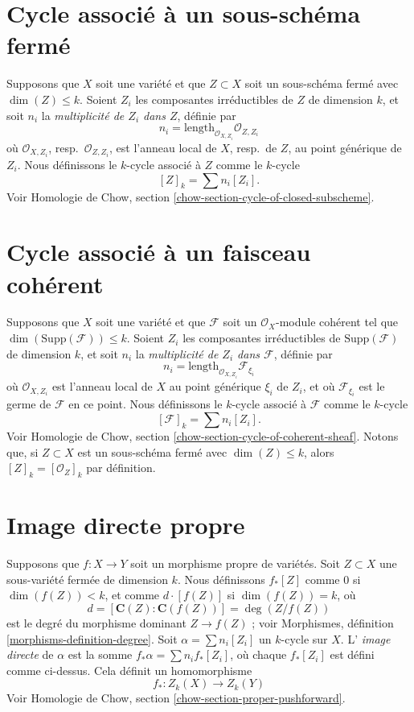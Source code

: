 \section{Cycle associé à un sous-schéma fermé}
\label{section-cycle-of-closed}

\noindent
Supposons que $X$ soit une variété et que $Z \subset X$ soit un sous-schéma fermé
avec $\dim(Z) \leq k$. Soient $Z_i$ les composantes irréductibles de $Z$ de
dimension $k$, et soit $n_i$ la {\it multiplicité de $Z_i$ dans $Z$},
définie par
$$
n_i = \text{length}_{\mathcal{O}_{X, Z_i}} \mathcal{O}_{Z, Z_i}
$$
où $\mathcal{O}_{X, Z_i}$, resp.\ $\mathcal{O}_{Z, Z_i}$, est l'anneau
local de $X$, resp.\ de $Z$, au point générique de $Z_i$.
Nous définissons le $k$-cycle associé à $Z$ comme le $k$-cycle
$$
[Z]_k = \sum n_i [Z_i].
$$
Voir Homologie de Chow, section \ref{chow-section-cycle-of-closed-subscheme}.


\section{Cycle associé à un faisceau cohérent}
\label{section-cycle-of-coherent-sheaf}

\noindent
Supposons que $X$ soit une variété et que
$\mathcal{F}$ soit un $\mathcal{O}_X$-module cohérent tel que
$\dim(\text{Supp}(\mathcal{F})) \leq k$.
Soient $Z_i$ les composantes irréductibles de $\text{Supp}(\mathcal{F})$
de dimension $k$, et soit $n_i$ la
{\it multiplicité de $Z_i$ dans $\mathcal{F}$}, définie par
$$
n_i = \text{length}_{\mathcal{O}_{X, Z_i}} \mathcal{F}_{\xi_i}
$$
où $\mathcal{O}_{X, Z_i}$ est l'anneau
local de $X$ au point générique $\xi_i$ de $Z_i$,
et où $\mathcal{F}_{\xi_i}$ est le germe de $\mathcal{F}$ en ce point.
Nous définissons le $k$-cycle associé à $\mathcal{F}$ comme le $k$-cycle
$$
[\mathcal{F}]_k = \sum n_i [Z_i].
$$
Voir Homologie de Chow, section \ref{chow-section-cycle-of-coherent-sheaf}.
Notons que, si $Z \subset X$ est un sous-schéma fermé avec $\dim(Z) \leq k$, alors
$[Z]_k = [\mathcal{O}_Z]_k$ par définition.


\section{Image directe propre}
\label{section-pushforward}

\noindent
Supposons que $f : X \to Y$ soit un morphisme propre de variétés.
Soit $Z \subset X$ une sous-variété fermée de dimension $k$.
Nous définissons $f_*[Z]$ comme $0$ si $\dim(f(Z)) < k$,
et comme $d \cdot [f(Z)]$ si $\dim(f(Z)) = k$, où
$$
d = [\mathbf{C}(Z) : \mathbf{C}(f(Z))] = \deg(Z/f(Z))
$$
est le degré du morphisme dominant $Z \to f(Z)$ ; voir
Morphismes, définition \ref{morphisms-definition-degree}.
Soit $\alpha = \sum n_i [Z_i]$ un $k$-cycle sur $X$. L'
{\it image directe} de $\alpha$ est la somme $f_* \alpha = \sum n_i f_*[Z_i]$,
où chaque $f_*[Z_i]$ est défini comme ci-dessus. Cela définit un homomorphisme
$$
f_* : Z_k(X) \longrightarrow Z_k(Y)
$$
Voir Homologie de Chow, section \ref{chow-section-proper-pushforward}.

